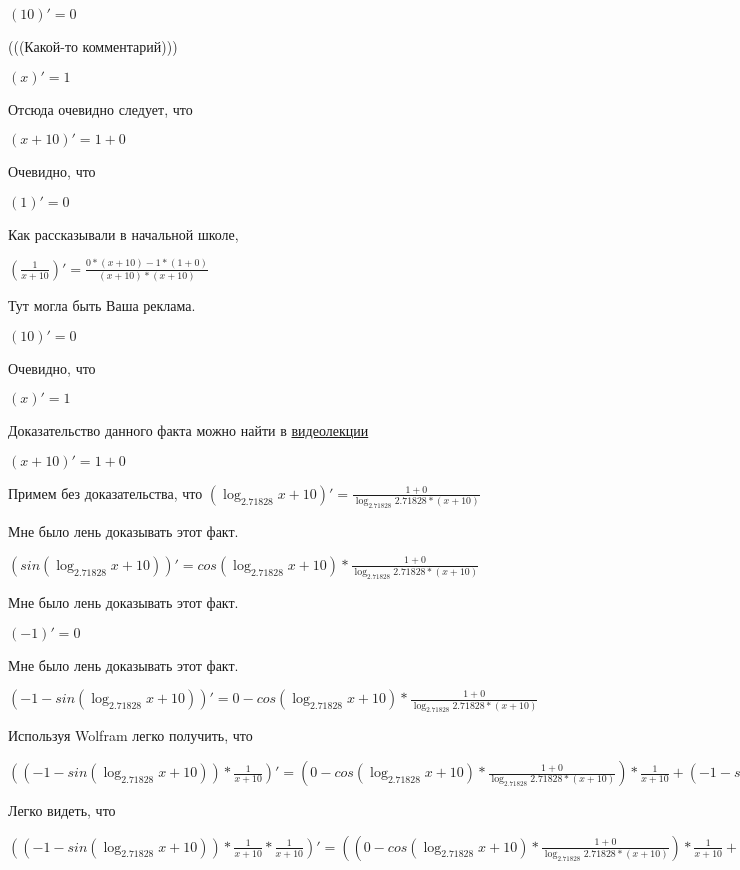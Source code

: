 \documentclass[12pt,a4paper,fleqn]{article}
\theoremstyle{definition}
\begin{document}
$( 10 )' =  0 $

(((Какой-то комментарий)))

$( x )' =  1 $

Отсюда очевидно следует, что

$( x  +  10 )' =  1  +  0 $

Очевидно, что

$( 1 )' =  0 $

Как рассказывали в начальной школе,

$(\frac{ 1 }{ x  +  10 }
)' = \frac{ 0  * ( x  +  10 ) -  1  * ( 1  +  0 )}{( x  +  10 ) * ( x  +  10 )}
$

Тут могла быть Ваша реклама.

$( 10 )' =  0 $

Очевидно, что

$( x )' =  1 $

Доказательство данного факта можно найти в \href{https://www.youtube.com/watch?v=dQw4w9WgXcQ}{видеолекции}

$( x  +  10 )' =  1  +  0 $

Примем без доказательства, что
$(\log_{ 2.71828 }{ x  +  10 })' = \frac{ 1  +  0 }{\log_{ 2.71828 }{ 2.71828 } * ( x  +  10 )}
$

Мне было лень доказывать этот факт.

$(sin(\log_{ 2.71828 }{ x  +  10 }))' = cos(\log_{ 2.71828 }{ x  +  10 }) * \frac{ 1  +  0 }{\log_{ 2.71828 }{ 2.71828 } * ( x  +  10 )}
$

Мне было лень доказывать этот факт.

$( -1 )' =  0 $

Мне было лень доказывать этот факт.

$( -1  - sin(\log_{ 2.71828 }{ x  +  10 }))' =  0  - cos(\log_{ 2.71828 }{ x  +  10 }) * \frac{ 1  +  0 }{\log_{ 2.71828 }{ 2.71828 } * ( x  +  10 )}
$

Используя Wolfram легко получить, что

$(( -1  - sin(\log_{ 2.71828 }{ x  +  10 })) * \frac{ 1 }{ x  +  10 }
)' = ( 0  - cos(\log_{ 2.71828 }{ x  +  10 }) * \frac{ 1  +  0 }{\log_{ 2.71828 }{ 2.71828 } * ( x  +  10 )}
) * \frac{ 1 }{ x  +  10 }
 + ( -1  - sin(\log_{ 2.71828 }{ x  +  10 })) * \frac{ 0  * ( x  +  10 ) -  1  * ( 1  +  0 )}{( x  +  10 ) * ( x  +  10 )}
$

Легко видеть, что

$(( -1  - sin(\log_{ 2.71828 }{ x  +  10 })) * \frac{ 1 }{ x  +  10 }
 * \frac{ 1 }{ x  +  10 }
)' = (( 0  - cos(\log_{ 2.71828 }{ x  +  10 }) * \frac{ 1  +  0 }{\log_{ 2.71828 }{ 2.71828 } * ( x  +  10 )}
) * \frac{ 1 }{ x  +  10 }
 + ( -1  - sin(\log_{ 2.71828 }{ x  +  10 })) * \frac{ 0  * ( x  +  10 ) -  1  * ( 1  +  0 )}{( x  +  10 ) * ( x  +  10 )}
) * \frac{ 1 }{ x  +  10 }
 + ( -1  - sin(\log_{ 2.71828 }{ x  +  10 })) * \frac{ 1 }{ x  +  10 }
 * \frac{ 0  * ( x  +  10 ) -  1  * ( 1  +  0 )}{( x  +  10 ) * ( x  +  10 )}
$
\end{document}
